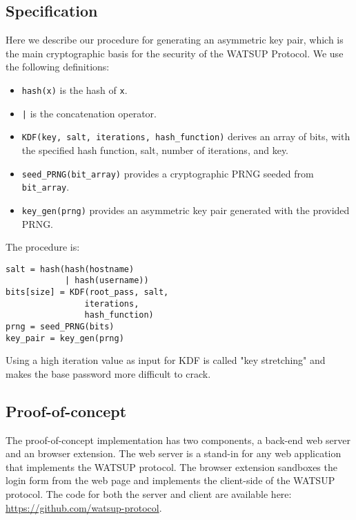 \subsection{Specification}

Here we describe our procedure for generating an asymmetric key pair, which is the main cryptographic basis for the security of the WATSUP Protocol. We use the following definitions:

\begin{itemize}

    \item \texttt{hash(x)} is the hash of \texttt{x}.

    \item \texttt{|} is the concatenation operator.

    \item \texttt{KDF(key, salt, iterations, hash\_function)} derives an array of bits, with the specified hash function, salt, number of iterations, and key.

    \item \texttt{seed\_PRNG(bit\_array)} provides a cryptographic PRNG seeded from \texttt{bit\_array}.

    \item \texttt{key\_gen(prng)} provides an asymmetric key pair generated with the provided PRNG.

\end{itemize}

\noindent The procedure is:

\begin{verbatim}
salt = hash(hash(hostname)
            | hash(username))
bits[size] = KDF(root_pass, salt,
                iterations,
                hash_function)
prng = seed_PRNG(bits)
key_pair = key_gen(prng)
\end{verbatim}

Using a high iteration value as input for KDF is called "key stretching" and makes the base password more difficult to crack.

\subsection{Proof-of-concept}

The proof-of-concept implementation has two components, a back-end web server and an browser extension. The web server is a stand-in for any web application that implements the WATSUP protocol. The browser extension sandboxes the login form from the web page and implements the client-side of the WATSUP protocol. The code for both the server and client are available here: \url{https://github.com/watsup-protocol}.

